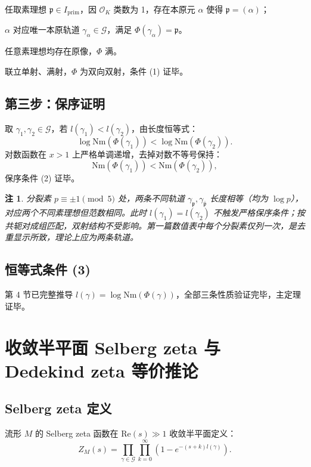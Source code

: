 \documentclass[12pt,a4paper]{article}
\newtheorem{remark}[theorem]{注}
\begin{document}
任取素理想 $\mathfrak{p} \in I_{\mathrm{prim}}$，因 $\mathcal{O}_K$ 类数为 1，存在本原元 $\alpha$ 使得 $\mathfrak{p} = (\alpha)$；

$\alpha$ 对应唯一本原轨道 $\gamma_\alpha \in \mathcal{G}$，满足 $\Phi(\gamma_\alpha) = \mathfrak{p}$。

任意素理想均存在原像，$\Phi$ 满。

联立单射、满射，$\Phi$ 为双向双射，条件 (1) 证毕。

\subsection{第三步：保序证明}

取 $\gamma_1, \gamma_2 \in \mathcal{G}$，若 $l(\gamma_1) < l(\gamma_2)$，由长度恒等式：
\[
\log \mathrm{Nm}(\Phi(\gamma_1)) < \log \mathrm{Nm}(\Phi(\gamma_2)).
\]
对数函数在 $x > 1$ 上严格单调递增，去掉对数不等号保持：
\[
\mathrm{Nm}(\Phi(\gamma_1)) < \mathrm{Nm}(\Phi(\gamma_2)),
\]
保序条件 (2) 证毕。

\begin{remark}
分裂素 $p \equiv \pm 1 \pmod{5}$ 处，两条不同轨道 $\gamma_\mathfrak{p}, \gamma_{\bar{\mathfrak{p}}}$ 长度相等（均为 $\log p$），对应两个不同素理想但范数相同。此时 $l(\gamma_1) = l(\gamma_2)$ 不触发严格保序条件；按共轭对成组匹配，双射结构不受影响。第一篇数值表中每个分裂素仅列一次，是去重显示所致，理论上应为两条轨道。
\end{remark}

\subsection{恒等式条件 (3)}

第 4 节已完整推导 $l(\gamma) = \log \mathrm{Nm}(\Phi(\gamma))$，全部三条性质验证完毕，主定理证毕。

\section{收敛半平面 Selberg zeta 与 Dedekind zeta 等价推论}

\subsection{Selberg zeta 定义}

流形 $M$ 的 Selberg zeta 函数在 $\mathrm{Re}(s) \gg 1$ 收敛半平面定义：
\[
Z_M(s) = \prod_{\gamma \in \mathcal{G}} \prod_{k=0}^{\infty} \left(1 - e^{-(s+k)l(\gamma)}\right).
\]
\end{document}
